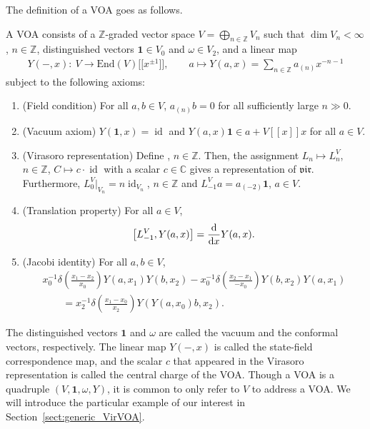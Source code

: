 \documentclass[10pt,a4paper]{amsart}
\numberwithin{equation}{section}
\newcommand{\End}{\mathrm{End}}
\newcommand{\id}{\operatorname{id}}
\newcommand{\bC}{\mathbb{C}}
\newcommand{\bZ}{\mathbb{Z}}
\newcommand{\voaV}{V}
\newcommand{\voagen}{V}
\newcommand{\voavac}{\mathbf{1}}
\newcommand{\voaY}{Y}
\newcommand{\voaconf}{\omega}
\newcommand{\vir}{\mathfrak{vir}}
\begin{document}
The definition of a VOA goes as follows.
\begin{defn}
A VOA consists of a $\bZ$-graded vector space $\voagen=\bigoplus_{n\in\bZ}\voagen_{n}$ such that $\dim\voagen_{n}<\infty$, $n\in\bZ$,
distinguished vectors $\voavac\in\voagen_{0}$ and $\voaconf\in\voagen_{2}$,
and a linear map
\begin{align*}
	\voaY(-,x)\colon \ \voagen\to \End(\voagen)\big[\big[x^{\pm 1}\big]\big],\qquad
	 a \mapsto \voaY (a,x) = \sum_{n\in \bZ}a_{(n)}x^{-n-1}
\end{align*}
subject to the following axioms:
\begin{enumerate}\itemsep=0pt
\item[(1)] 	(Field condition) For all $a,b\in \voaV$, $a_{(n)}b=0$ for all sufficiently large $n\gg 0$.
\item[(2)] 	(Vacuum axiom) $\voaY(\voavac,x) = \id$ and
$
		\voaY (a,x)\voavac \in a + \voaV [[x]]x
$
	for all $a\in \voaV$.
\item[(3)] 	(Virasoro representation) Define \smash{$L^{\voaV}_{n} = \voaconf_{(n+1)}\in \End(\voaV)$}, $n\in\bZ$. Then, the assignment $L_{n}\mapsto L^{\voaV}_{n}$, $n\in\bZ$, $C\mapsto c\cdot \id$ with a scalar $c\in \bC$
gives a representation of $\vir$.
Furthermore, $L^{\voaV}_{0}|_{\voaV_{n}}=n\id_{\voaV_{n}}$, $n\in\bZ$ and $L^{\voaV}_{-1}a = a_{(-2)}\voavac$, $a\in \voaV$.
\item[(4)] 	(Translation property) For all $a\in \voaV$,
	\begin{align*}
		\big[L_{-1}^{\voaV}, \voaY(a,x)\big] = \frac{\rm d}{{\rm d}x}\voaY(a,x).
	\end{align*}
\item[(5)] 	(Jacobi identity) For all $a,b\in \voaV$,
	\begin{gather*}
 x_{0}^{-1}\delta \left(\frac{x_{1}-x_{2}}{x_{0}}\right)\voaY(a,x_{1})\voaY (b,x_{2})-x_{0}^{-1}\delta\left(\frac{x_{2}-x_{1}}{-x_{0}}\right)\voaY (b,x_{2})\voaY(a,x_{1}) \\
 \qquad = x_{2}^{-1}\delta\left(\frac{x_{1}-x_{0}}{x_{2}}\right)\voaY\left(\voaY(a,x_{0})b,x_{2}\right).
\end{gather*}
\end{enumerate}
\end{defn}

The distinguished vectors $\voavac$ and $\voaconf$ are called the vacuum and the conformal vectors, respectively.
The linear map $\voaY(-,x)$ is called the state-field correspondence map, and
the scalar $c$ that appeared in the Virasoro representation is called the central charge of the VOA.
Though a VOA is a quadruple $(\voaV, \voavac,\voaconf,\voaY)$,
it is common to only refer to $\voaV$ to address a VOA.
We will introduce the particular example of our interest in Section~\ref{sect:generic_VirVOA}.
\end{document}
